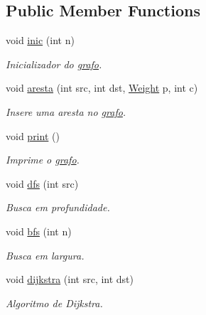 \subsection*{Public Member Functions}
\begin{DoxyCompactItemize}
\item 
void \hyperlink{structgrafo_aaeb29fff6b2f5df43d6cd809942a0642}{inic} (int n)
\begin{DoxyCompactList}\small\item\em Inicializador do \hyperlink{structgrafo}{grafo}. \item\end{DoxyCompactList}\item 
void \hyperlink{structgrafo_ab6ebe34207a6e548bd74c80e1844f630}{aresta} (int src, int dst, \hyperlink{graph_8cpp_aa4dd30204ac53d8c88cfd0cab7b81789}{Weight} p, int c)
\begin{DoxyCompactList}\small\item\em Insere uma aresta no \hyperlink{structgrafo}{grafo}. \item\end{DoxyCompactList}\item 
void \hyperlink{structgrafo_afd949f9470a970902ffa14a665c78fde}{print} ()
\begin{DoxyCompactList}\small\item\em Imprime o \hyperlink{structgrafo}{grafo}. \item\end{DoxyCompactList}\item 
void \hyperlink{structgrafo_ac221e25487f344b45730a6de4c28a167}{dfs} (int src)
\begin{DoxyCompactList}\small\item\em Busca em profundidade. \item\end{DoxyCompactList}\item 
void \hyperlink{structgrafo_a9595de9af6e7aa1209bcd1d320751d4a}{bfs} (int n)
\begin{DoxyCompactList}\small\item\em Busca em largura. \item\end{DoxyCompactList}\item 
void \hyperlink{structgrafo_aca0027d6158bf78e948fcde0f1b72cb2}{dijkstra} (int src, int dst)
\begin{DoxyCompactList}\small\item\em Algoritmo de Dijkstra. \item\end{DoxyCompactList}\item 

\end{DoxyCompactItemize}
